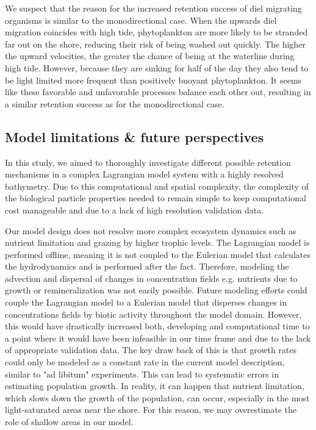 \documentclass[npg, manuscript]{copernicus}
\begin{document}
We suspect that the reason for the increased retention success of diel migrating organisms is similar to the monodirectional case.
When the upwards diel migration coincides with high tide, phytoplankton are more likely to be stranded far out on the shore, reducing their risk of being washed out quickly.
The higher the upward velocities, the greater the chance of being at the waterline during high tide.
However, because they are sinking for half of the day they also tend to be light limited more frequent than positively buoyant phytoplankton.
It seems like these favorable and unfavorable processes balance each other out, resulting in a similar retention success as for the monodirectional case.


\subsection{Model limitations \& future perspectives}

In this study, we aimed to thoroughly investigate different possible retention mechanisms in a complex Lagrangian model system with a highly resolved bathymetry.  
Due to this computational and spatial complexity, the complexity of the biological particle properties needed to remain simple to keep computational cost manageable and due to a lack of high resolution validation data.

Our model design does not resolve more complex ecosystem dynamics such as nutrient limitation and grazing by higher trophic levels. 
The Lagrangian model is performed offline, meaning it is not coupled to the Eulerian model that calculates the hydrodynamics and is performed after the fact.
Therefore, modeling the advection and dispersal of changes in concentration fields e.g. nutrients due to growth or remineralization was not easily possible.
Future modeling efforts could couple the Lagrangian model to a Eulerian model that disperses changes in concentrations fields by biotic activity throughout the model domain.
However, this would have drastically increased both, developing and computational time to a point where it would have been infeasible in our time frame and due to the lack of appropriate validation data.
The key draw back of this is that growth rates could only be modeled as a constant rate in the current model description, similar to "ad libitum" experiments. 
This can lead to systematic errors in estimating population growth.
In reality, it can happen that nutrient limitation, which slows down the growth of the population, can occur, especially in the most light-saturated areas near the shore. For this reason, we may overestimate the role of shallow areas in our model.
\end{document}

